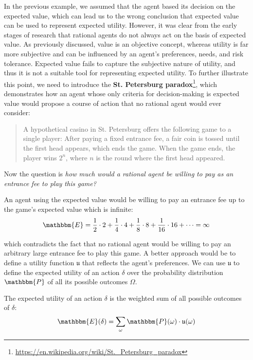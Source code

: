In the previous example, we assumed that the agent based its decision on the expected value, which can lead us to the wrong conclusion that expected value can be used to represent expected utility. However, it was clear from the early stages of research that rational agents do not always act on the basis of expected value. As previously discussed, value is an objective concept, whereas utility is far more subjective and can be influenced by an agent's preferences, needs, and risk tolerance. Expected value fails to capture the subjective nature of utility, and thus it is not a suitable tool for representing expected utility. To further illustrate this point, we need to introduce the \textbf{St. Petersburg paradox}\footnote{\url{https://en.wikipedia.org/wiki/St._Petersburg_paradox}}, which demonstrates how an agent whose only criteria for decision-making is expected value would propose a course of action that no rational agent would ever consider:

\begin{quotation}
    A hypothetical casino in St. Petersburg offers the following game to a single player:
    After paying a fixed entrance fee, a fair coin is tossed until the first head appears, which ends the game. When the game ends, the player wins $2^n$, where $n$ is the round where the first head appeared.
\end{quotation}

Now the question is \textit{how much would a rational agent be willing to pay as an entrance fee to play this game?}

An agent using the expected value would be willing to pay an entrance fee up to the game's expected value which is infinite:
$$  \mathbbm{E} = \frac{1}{2} \cdot 2 + \frac{1}{4} \cdot 4 + \frac{1}{8} \cdot 8 + \frac{1}{16} \cdot 16 + \dots = \infty$$

which contradicts the fact that no rational agent would be willing to pay an arbitrary large entrance fee to play this game. A better approach would be to define a utility function $\mathfrak{u}$ that reflects the agent's preferences. We can use $\mathfrak{u}$ to define the expected utility of an action $\delta$ over the probability distribution $\mathbbm{P}$ of all its possible outcomes $\Omega$.

\begin{Tdef}
    The expected utility of an action $\delta$ is the weighted sum of all possible outcomes of $\delta$:
    $$\mathbbm{E}(\delta) = \sum_{\omega} \mathbbm{P}(\omega) \cdot \mathfrak{u}(\omega)$$
\end{Tdef}

